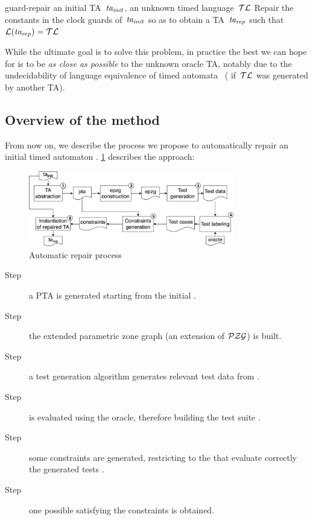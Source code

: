 \begin{tikzborder}{\cite{Gargantini16:validation}}
\begin{tikzborder}{\cite{gargantini_combinatorial_2017}}
\begin{tikzborder}{\cite{garn2019}}
\begin{tikzborder}{\cite{arcaini2019achieving}}
\begin{tikzborder}{\cite{arcaini2019varivolution}}
{guard-repair}
{an initial TA~$\mathit{ta_{init}}$, an unknown timed language~$\mathcal{TL}$}
{Repair the constants in the clock guards of~$\mathit{ta_{init}}$ so as to obtain a TA~$\mathit{ta_{rep}}$ such that $\mathcal{L}(\mathit{ta_{rep}}) = \mathcal{TL}$}

While the ultimate goal is to solve this problem, in practice the best we can hope for is to be \emph{as close as possible} to the unknown oracle TA, notably due to the undecidability of language equivalence of timed automata~\cite{AD94} (\eg{} if~$\mathcal{TL}$ was generated by another TA).
\be

\subsection{Overview of the method}

\begin{tikzborder}{}
From now on, we describe the process we propose to automatically repair an initial timed automaton \initTa.
\ref{fig:repairProcess} describes the approach:
\end{tikzborder}
\begin{figure}[!htb]
	\centering
	\includegraphics[width=0.8\textwidth]{images/repairProcess-oneShot}
	\caption{Automatic repair process}
	\label{fig:repairProcess}
\end{figure}
%
\begin{description}
	\item[Step ] a PTA \ptaProc is generated starting from the initial \ta \initTa.
	\item[Step ] the extended parametric zone graph \epzg (an extension of $\mathcal{PZG}$) is built.
	\item[Step ] a test generation algorithm generates relevant test data \testData from \epzg.
	\item[Step ] \testData is evaluated using the oracle, therefore building the test suite \testSuiteTA.
	\item[Step ] some constraints \ptaConstr are generated, restricting \ptaProc to the \tas that evaluate correctly the generated tests \testSuiteTA.
	\item[Step ] one possible \ta satisfying the constraints \ptaConstr is obtained.
\end{description}


\end{tikzborder}
\end{tikzborder}
\end{tikzborder}
\end{tikzborder}
\end{tikzborder}
